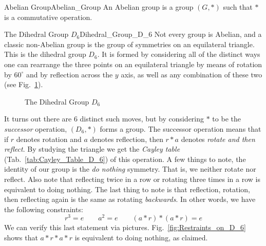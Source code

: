     \begin{fdefinition}{Abelian Group}{Abelian_Group}
        An \gls{Abelian group} is a \gls{group} $(G,*)$ such that $*$ is
        a \gls{commutative operation}.
    \end{fdefinition}
    \begin{lexample}{The Dihedral Group $D_{6}$}{Dihedral_Group_D_6}
        Not every group is Abelian, and a classic non-Abelian group is the group
        of symmetries on an equilateral triangle. This is the dihedral group
        $D_{6}$. It is formed by considering all of the distinct ways one can
        rearrange the three points on an equilateral triangle by means of
        rotation by $60^{\circ}$ and by reflection across the $y$ axis, as well
        as any combination of these two (see Fig.~\ref{fig:Dihedral_Group_D_6}).
        \begin{figure}[H]
            \centering
            \captionsetup{type=figure}
            
            \caption{The Dihedral Group $D_{6}$}
            \label{fig:Dihedral_Group_D_6}
        \end{figure}
        It turns out there are 6 distinct such moves, but by considering $*$ to
        be the \textit{successor} operation, $(D_{6},*)$ forms a group. The
        successor operation means that if $r$ denotes rotation and $a$ denotes
        reflection, then $r*a$ denotes \textit{rotate and then reflect}. By
        studying the triangle we get the \textit{Cayley table}
        (Tab.~\ref{tab:Cayley_Table_D_6}) of this operation. A few things to
        note, the identity of our group is the \textit{do nothing} symmetry.
        That is, we neither rotate nor reflect. Also note that reflecting twice
        in a row or rotating three times in a row is equivalent to doing
        nothing. The last thing to note is that reflection, rotation, then
        reflecting again is the same as rotating \textit{backwards}. In other
        words, we have the following constraints:
        \begin{equation}
            r^{3}=e
            \quad\quad
            a^{2}=e
            \quad\quad
            (a*r)*(a*r)=e
        \end{equation}
        We can verify this last statement via pictures.
        Fig.~\ref{fig:Restraints_on_D_6} shows that $a*r*a*r$ is equivalent to
        doing nothing, as claimed.
        \begin{figure}[H]
            \centering
            \captionsetup{type=figure}

\end{figure}
\end{lexample}
